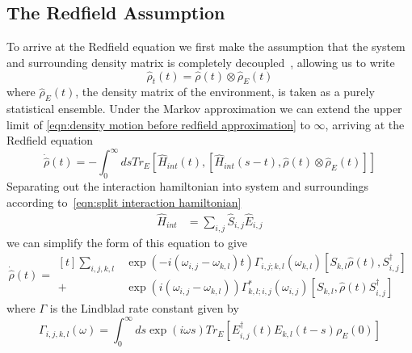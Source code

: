 \subsection{The Redfield Assumption}\label{sec:the redfield assumption}
To arrive at the Redfield equation
we first make the assumption that the
system and surrounding density
matrix is completely
decoupled~\cite{theory_open_quantum_systems},
allowing us to write
\begin{equation}
    \hat{\rho}_t(t) = \hat{\rho}(t) \otimes \hat{\rho}_E(t)
\end{equation}
where \(\hat{\rho}_E(t)\), the
density matrix of the environment,
is taken as a purely statistical ensemble.
Under the Markov approximation
we can extend the upper limit
of \cref{eqn:density motion before redfield approximation}
to \(\infty \), arriving at the Redfield
equation
\begin{equation}
    \dot{\hat{\rho}}(t) =
    - \int_0^{\infty} ds
    Tr_{E}[\hat{H}_{int}(t),
            [\hat{H}_{int}(s-t),
                    \hat{\rho}(t) \otimes \hat{\rho}_E(t)]]
\end{equation}
Separating out the interaction hamiltonian
into system and surroundings according
to~\cref{eqn:split interaction hamiltonian}
\begin{align}
    \hat{H}_{int} & = \sum_{i,j} \hat{S}_{i,j} \hat{E}_{i,j}
\end{align}
we can simplify the form of this equation\cite{Manzano_2020} to give
\begin{equation}
    \dot{\hat{\rho{}}}(t) = \begin{aligned}[t]
        \sum_{i,j,k, l} &
        \exp{(-i(\omega_{i,j}-\omega_{k,l})t)}
        \Gamma_{i,j;k, l}(\omega_{k,l})
        [S_{k, l}\hat{\rho}(t),
        S^\dagger_{i,j}]  \\
        +               &
        \exp{(i(\omega_{i,j}-\omega_{k,l}))}
        \Gamma^*_{k, l; i,j}(\omega_{i,j})
        [S_{k, l},
            \hat{\rho}(t) S^\dagger_{i,j}]
    \end{aligned} \label{eqn:redfield equation gamma form}
\end{equation}
where \(\Gamma \) is the
Lindblad rate constant given by
\begin{equation}
    \Gamma_{i,j, k,l}(\omega) =
    \int_0^\infty{}{
    ds \exp{(i\omega{}s)}
    Tr_{E}[E^\dagger_{i,j}(t)E_{k,l}(t-s)\rho_E(0)]
    }\label{eqn:gamma definition}
\end{equation}

